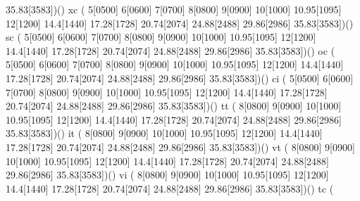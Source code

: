                            35.83[3583])()
     \makefont\fonttwoletters xc   %
                          ( 5[0500] 6[0600] 7[0700] 8[0800] 9[0900]
                           10[1000] 10.95[1095] 12[1200] 14.4[1440]
                           17.28[1728] 20.74[2074] 24.88[2488] 29.86[2986]
                           35.83[3583])()
     \makefont\fonttwoletters sc   %
                          ( 5[0500] 6[0600] 7[0700] 8[0800] 9[0900]
                           10[1000] 10.95[1095] 12[1200] 14.4[1440]
                           17.28[1728] 20.74[2074] 24.88[2488] 29.86[2986]
                           35.83[3583])()
     \makefont\fonttwoletters oc    %
                          ( 5[0500] 6[0600] 7[0700] 8[0800] 9[0900]
                           10[1000] 10.95[1095] 12[1200] 14.4[1440]
                           17.28[1728] 20.74[2074] 24.88[2488] 29.86[2986]
                           35.83[3583])()
     \makefont\fonttwoletters ci    %
                          ( 5[0500] 6[0600] 7[0700] 8[0800] 9[0900]
                           10[1000] 10.95[1095] 12[1200] 14.4[1440]
                           17.28[1728] 20.74[2074] 24.88[2488] 29.86[2986]
                           35.83[3583])()
     \makefont\fonttwoletters tt   %
                          (%
                           8[0800] 9[0900]
                           10[1000] 10.95[1095] 12[1200] 14.4[1440]
                           17.28[1728] 20.74[2074] 24.88[2488] 29.86[2986]
                           35.83[3583])()
     \makefont\fonttwoletters it   %
                          (%
                           8[0800] 9[0900]
                           10[1000] 10.95[1095] 12[1200] 14.4[1440]
                           17.28[1728] 20.74[2074] 24.88[2488] 29.86[2986]
                           35.83[3583])()
     \makefont\fonttwoletters vt   %
                          (%
                           8[0800] 9[0900]
                           10[1000] 10.95[1095] 12[1200] 14.4[1440]
                           17.28[1728] 20.74[2074] 24.88[2488] 29.86[2986]
                           35.83[3583])()
     \makefont\fonttwoletters vi   %
                          (%
                           8[0800] 9[0900]
                           10[1000] 10.95[1095] 12[1200] 14.4[1440]
                           17.28[1728] 20.74[2074] 24.88[2488] 29.86[2986]
                           35.83[3583])()
     \makefont\fonttwoletters tc   %
                          (%
